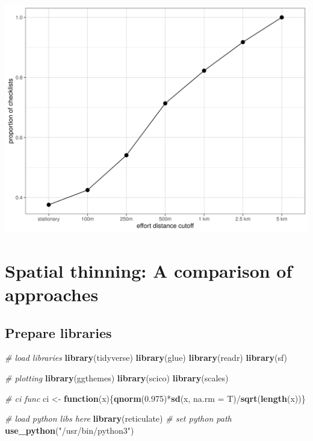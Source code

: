 \documentclass[]{article}
\newenvironment{Shaded}{}{}
\newcommand{\CommentTok}[1]{\textcolor[rgb]{0.38,0.63,0.69}{\textit{#1}}}
\newcommand{\ControlFlowTok}[1]{\textcolor[rgb]{0.00,0.44,0.13}{\textbf{#1}}}
\newcommand{\DataTypeTok}[1]{\textcolor[rgb]{0.56,0.13,0.00}{#1}}
\newcommand{\FloatTok}[1]{\textcolor[rgb]{0.25,0.63,0.44}{#1}}
\newcommand{\KeywordTok}[1]{\textcolor[rgb]{0.00,0.44,0.13}{\textbf{#1}}}
\newcommand{\NormalTok}[1]{#1}
\newcommand{\OperatorTok}[1]{\textcolor[rgb]{0.40,0.40,0.40}{#1}}
\newcommand{\StringTok}[1]{\textcolor[rgb]{0.25,0.44,0.63}{#1}}
\begin{document}
\begin{center}\includegraphics[width=\textwidth]{figs/fig_cutoff_effort} \end{center}

\hypertarget{spatial-thinning-a-comparison-of-approaches}{%
\section{Spatial thinning: A comparison of approaches}\label{spatial-thinning-a-comparison-of-approaches}}

\hypertarget{prepare-libraries-5}{%
\subsection{Prepare libraries}\label{prepare-libraries-5}}

\begin{Shaded}
\begin{Highlighting}[]
\CommentTok{# load libraries}
\KeywordTok{library}\NormalTok{(tidyverse)}
\KeywordTok{library}\NormalTok{(glue)}
\KeywordTok{library}\NormalTok{(readr)}
\KeywordTok{library}\NormalTok{(sf)}

\CommentTok{# plotting}
\KeywordTok{library}\NormalTok{(ggthemes)}
\KeywordTok{library}\NormalTok{(scico)}
\KeywordTok{library}\NormalTok{(scales)}

\CommentTok{# ci func}
\NormalTok{ci <-}\StringTok{ }\ControlFlowTok{function}\NormalTok{(x)\{}\KeywordTok{qnorm}\NormalTok{(}\FloatTok{0.975}\NormalTok{)}\OperatorTok{*}\KeywordTok{sd}\NormalTok{(x, }\DataTypeTok{na.rm =}\NormalTok{ T)}\OperatorTok{/}\KeywordTok{sqrt}\NormalTok{(}\KeywordTok{length}\NormalTok{(x))\}}

\CommentTok{# load python libs here}
\KeywordTok{library}\NormalTok{(reticulate)}
\CommentTok{# set python path}
\KeywordTok{use_python}\NormalTok{(}\StringTok{"/usr/bin/python3"}\NormalTok{)}
\end{Highlighting}
\end{Shaded}
\end{document}
